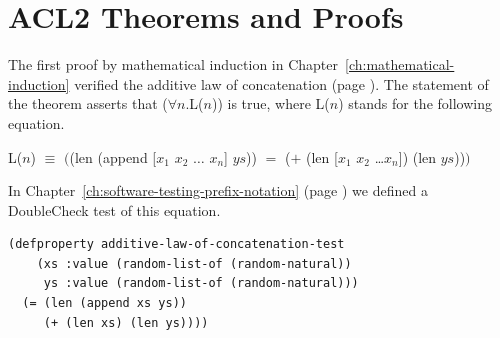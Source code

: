 \section{ACL2 Theorems and Proofs}
\label{sec:theorems-and-acl2-proofs}

The first proof by mathematical induction
in Chapter~\ref{ch:mathematical-induction}
verified the additive law of concatenation
(page \pageref{additive-law-concatenation}).
The statement of the theorem asserts that ($\forall$$n$.L($n$)) is true,
where L($n$) stands for the following equation.
\label{eq:Ln-additive-law}
\begin{center}
L($n$) $\equiv$ $($\textsf{(len (append [$x_1$ $x_2$ $\dots$ $x_n$] $ys$))} $=$
\textsf{($+$ (len [$x_1$ $x_2$ \dots $x_n$]) (len $ys$))}$)$
\end{center}

In Chapter~\ref{ch:software-testing-prefix-notation} (page \pageref{additive-lengths-test})
we defined a DoubleCheck test of this equation.

\begin{code}
\begin{verbatim}
(defproperty additive-law-of-concatenation-test
    (xs :value (random-list-of (random-natural))
     ys :value (random-list-of (random-natural)))
  (= (len (append xs ys))
     (+ (len xs) (len ys))))
\end{verbatim}
\end{code}

